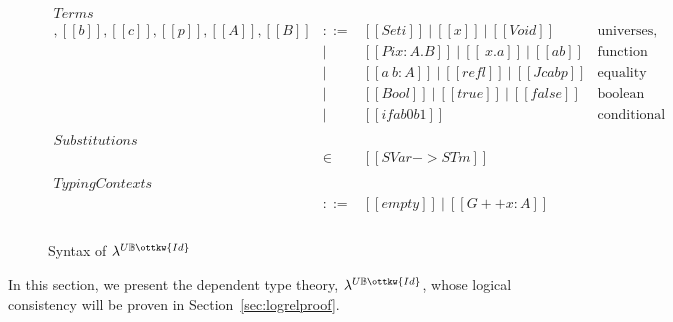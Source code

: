 \documentclass[acmsmall,screen=true,
\ifpublic review=false\else,review=true\fi
  ,anonymous=\ifanonymous true\else false\fi]{acmart}
\newcommand{\lang}{$\lambda^{U\mathbb{B}\ottkw{Id}}$\xspace}
\begin{document}
\begin{figure}[h]
\[
\begin{array}{lcll}
\mathit{Terms}\\
[[a]],[[b]],[[c]],[[p]],[[A]],[[B]] & ::= & [[Set i]]\ |\ [[x]]\  |\ [[Void]]
                  & \mbox{universes, variables, empty type} \\
            & |   & [[Pi x : A . B]]\ |\ [[\ x . a]]\ |\ [[a b]]
                  & \mbox{function types, abstractions, applications} \\
            & |   & [[a ~ b : A ]]\ |\  [[refl]]\ |\ [[J c a b p]]
                  & \mbox{equality types, reflexivity proof, J eliminator} \\
            & |   & [[Bool]]\ |\  [[true]]\ |\  [[false]]\ %
                  & \mbox{boolean type, true, false} \\
            & |   & [[if a b0 b1]]
                  & \mbox{conditional expression} \\ \\
\mathit{Substitutions}\\
[[rho]] & \in & [[SVar -> STm]] & \\ \\
\mathit{Typing Contexts}\\
 [[G]]       & ::= & [[empty]]\ |\ [[G ++ x : A]] &  \\ \\
\end{array}
\]
  \caption{Syntax of \lang}
  \label{fig:syntax}
\end{figure}


In this section, we present the dependent type theory, \lang{}, whose logical
consistency will be proven in Section~\ref{sec:logrelproof}. 
\end{document}
